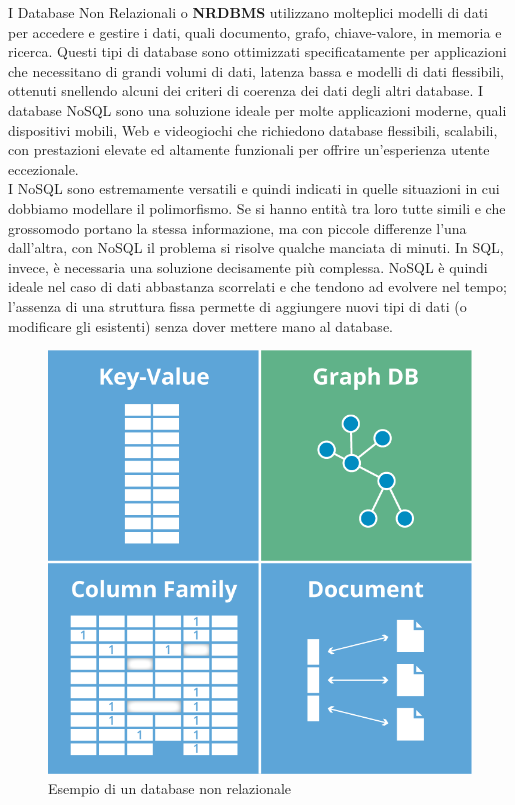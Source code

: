 I Database Non Relazionali o \textbf{NRDBMS} utilizzano molteplici modelli di dati per accedere e gestire i dati, quali documento, grafo, chiave-valore, in memoria e ricerca. Questi tipi di database sono ottimizzati specificatamente per applicazioni che necessitano di grandi volumi di dati, latenza bassa e modelli di dati flessibili, ottenuti snellendo alcuni dei criteri di coerenza dei dati degli altri database. I database NoSQL sono una soluzione ideale per molte applicazioni moderne, quali dispositivi mobili, Web e videogiochi che richiedono database flessibili, scalabili, con prestazioni elevate ed altamente funzionali per offrire un'esperienza utente eccezionale.\\
I NoSQL sono estremamente versatili e quindi indicati in quelle situazioni in cui dobbiamo modellare il polimorfismo. Se si hanno entità tra loro tutte simili e che grossomodo portano la stessa informazione, ma con piccole differenze l’una dall’altra, con NoSQL il problema si risolve qualche manciata di minuti. In SQL, invece, è necessaria una soluzione decisamente più complessa. NoSQL è quindi ideale nel caso di dati abbastanza scorrelati e che tendono ad evolvere nel tempo; l’assenza di una struttura fissa permette di aggiungere nuovi tipi di dati (o modificare gli esistenti) senza dover mettere mano al database.
\begin{figure}
	\begin{center}
		\includegraphics[width=0.45\columnwidth]{images/nonrelational_db}
	\end{center}
	\caption{Esempio di un database non relazionale}
	\label{fig:nonrelational_db}
\end{figure}

